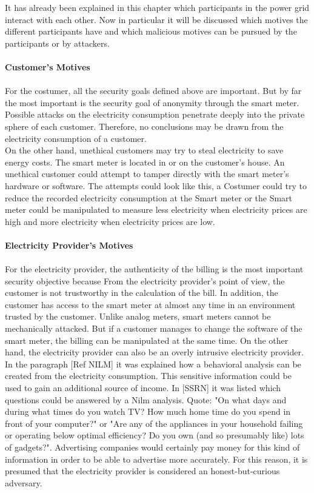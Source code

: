 It has already been explained in this chapter which participants in the power grid interact with each other. Now in particular it will be discussed which motives the different participants have and which malicious motives can be pursued by the participants or by attackers.
\\
\\
\textbf{Customer's Motives}
\\
\\
For the costumer, all the security goals defined above are important. But by far the most important is the security goal of anonymity through the smart meter. Possible attacks on the electricity consumption penetrate deeply into the private sphere of each customer. Therefore, no conclusions may be drawn from the electricity consumption of a customer.\\
On the other hand, unethical customers may try to steal electricity to save energy costs. The smart meter is located in or on the customer's house. An unethical customer could attempt to tamper directly with the smart meter's hardware or software. The attempts could look like this, a Costumer could try to reduce the recorded electricity consumption at the Smart meter or the Smart meter could be manipulated to measure less electricity when electricity prices are high and more electricity when electricity prices are low.
\\
\\
\textbf{Electricity Provider's Motives}
\\
\\
For the electricity provider, the authenticity of the billing is the most important security objective because From the electricity provider's point of view, the customer is not trustworthy in the calculation of the bill. In addition, the customer has access to the smart meter at almost any time in an environment trusted by the customer. Unlike analog meters, smart meters cannot be mechanically attacked. But if a customer manages to change the software of the smart meter, the billing can be manipulated at the same time. On the other hand, the electricity provider can also be an overly intrusive electricity provider. In the paragraph [Ref NILM] it was explained how a behavioral analysis can be created from the electricity consumption. This sensitive information could be used to gain an additional source of income. In [SSRN] it was listed which questions could be answered by a Nilm analysis. Quote: "On what days and during what times do you watch TV? How much home time do you spend in front of your computer?" or "Are any of the appliances in your household failing or operating below optimal efficiency? Do you own (and so presumably like) lots of gadgets?". Advertising companies would certainly pay money for this kind of information in order to be able to advertise more accurately. For this reason, it is presumed that the electricity provider is considered an honest-but-curious adversary. 

